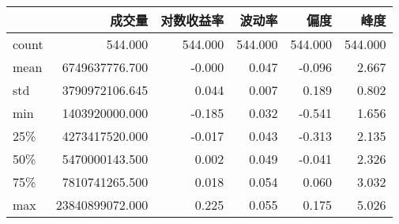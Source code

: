 \begin{tabular}{lrrrrr}
\toprule
{} &             成交量 &   对数收益率 &     波动率 &      偏度 &      峰度 \\
\midrule
count &         544.000 & 544.000 & 544.000 & 544.000 & 544.000 \\
mean  &  6749637776.700 &  -0.000 &   0.047 &  -0.096 &   2.667 \\
std   &  3790972106.645 &   0.044 &   0.007 &   0.189 &   0.802 \\
min   &  1403920000.000 &  -0.185 &   0.032 &  -0.541 &   1.656 \\
25\%   &  4273417520.000 &  -0.017 &   0.043 &  -0.313 &   2.135 \\
50\%   &  5470000143.500 &   0.002 &   0.049 &  -0.041 &   2.326 \\
75\%   &  7810741265.500 &   0.018 &   0.054 &   0.060 &   3.032 \\
max   & 23840899072.000 &   0.225 &   0.055 &   0.175 &   5.026 \\
\bottomrule
\end{tabular}
